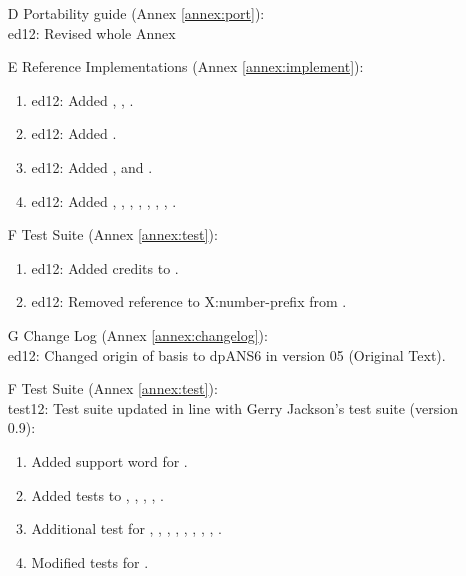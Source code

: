 \begin{itemize}
	\item[D] Portability guide (Annex \ref{annex:port}):			%
		\\ \textsf{ed12}: Revised whole Annex

	\item[E] Reference Implementations (Annex \ref{annex:implement}):	%
		\begin{enumerate}
		\item \textsf{ed12}: Added , , .
		\item \textsf{ed12}: Added .
		\item \textsf{ed12}: Added ,  and .
		\item \textsf{ed12}: Added
			,
			,
			,
			,
			,
			,
			,
			.
		\end{enumerate}
	\item[F] Test Suite (Annex \ref{annex:test}):					%
		\begin{enumerate}
		\item \textsf{ed12}: Added credits to .
		\item \textsf{ed12}: Removed reference to \textsf{X:number-prefix}
			from .
		\end{enumerate}

	\item[G] Change Log (Annex \ref{annex:changelog}): \\
		\textsf{ed12}: Changed origin of basis to dpANS6 in
			version 05 (Original Text).

	\end{itemize}


	\begin{itemize}
	\item[F] Test Suite (Annex \ref{annex:test}): \\
		\textsf{test12}: Test suite updated in line with Gerry Jackson's test suite (version 0.9):
		\begin{enumerate}
		\item Added support word for .
		\item Added tests to
			,
			,
			,
			,
			.
		\item Additional test for
			,
			,
			,
			,
			,
			,
			,
			,
			.
		\item Modified tests for
			.
		\end{enumerate}
	\end{itemize}


